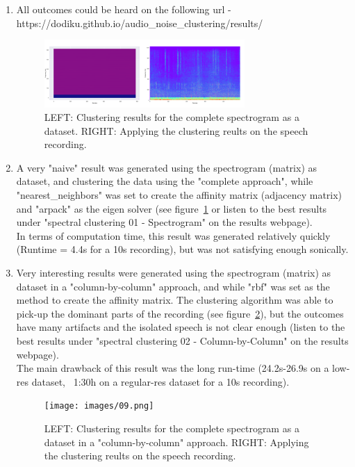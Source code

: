 \documentclass[10pt,twocolumn]{article}
\begin{document}
\begin{enumerate}
  \item All outcomes could be heard on the following url - https://dodiku.github.io/audio\_noise\_clustering/results/

  \begin{figure}[!h]
    \begin{center}
      \includegraphics[width=3in]{images/07.png}
    \end{center}
    \caption{LEFT: Clustering results for the complete spectrogram as a dataset. RIGHT: Applying the clustering reults on the speech recording.}
    \label{07}
  \end{figure}

  \item A very "naive" result was generated using the spectrogram (matrix) as dataset, and clustering the data using the "complete approach", while "nearest\_neighbors" was set to create the affinity matrix (adjacency matrix) and "arpack" as the eigen solver (see figure~\ref{07} or listen to the best results under "spectral clustering 01 - Spectrogram" on the results webpage).
  \\In terms of computation time, this result was generated relatively quickly (Runtime = 4.4s for a 10s recording), but was not satisfying enough sonically.

\item Very interesting results were generated using the spectrogram (matrix) as dataset in a "column-by-column" approach, and while "rbf" was set as the method to create the affinity matrix. The clustering algorithm was able to pick-up the dominant parts of the recording (see figure~\ref{09}), but the outcomes have many artifacts and the isolated speech is not clear enough (listen to the best results under "spectral clustering 02 - Column-by-Column" on the results webpage).
\\The main drawback of this result was the long run-time (24.2s-26.9s on a low-res dataset, ~1:30h on a regular-res dataset for a 10s recording).

\begin{figure}[!h]
  \begin{center}
    \texttt{[image: images/09.png]}
  \end{center}
  \caption{LEFT: Clustering results for the complete spectrogram as a dataset in a "column-by-column" approach. RIGHT: Applying the clustering reults on the speech recording.}
  \label{09}
\end{figure}


\end{enumerate}
\end{document}
